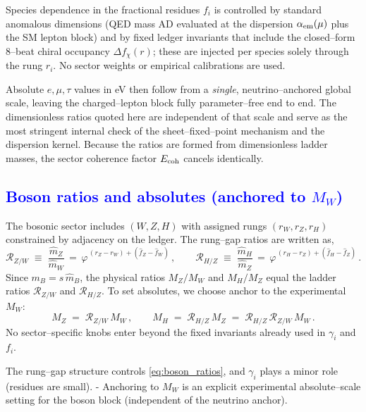 \documentclass[%
 amsmath,amssymb,
 aps,
prb,
floatfix, showkeys
]{revtex4-2}
\newcommand{\modif}[1]{\textcolor{blue}{#1}}
\begin{document}
Species dependence in the fractional residues $f_i$ is controlled by standard anomalous dimensions (QED mass AD evaluated at the dispersion $\alpha_{\rm em}(\mu)$ plus the SM lepton block) and by fixed ledger invariants that include the closed–form 8–beat chiral occupancy $\Delta f_\chi(r)$; these are injected per species solely through the rung $r_i$. No sector weights or empirical calibrations are used.

Absolute $e,\mu,\tau$ values in eV then follow from a \emph{single},
neutrino–anchored global scale, leaving the charged–lepton block fully parameter–free end to end.
The dimensionless ratios quoted here are independent of that scale and serve as the most
stringent internal check of the sheet–fixed–point mechanism and the dispersion kernel.
Because the ratios are formed from dimensionless ladder masses, the sector
coherence factor $E_{\rm coh}$ cancels identically.








{\modif{
\subsection{Boson ratios and absolutes (anchored to $M_W$)}
\label{subsec:bosons}
}}
The bosonic sector includes $(W,Z,H)$ with assigned rungs $(r_W,r_Z,r_H)$ constrained by adjacency on the ledger.
The rung--gap ratios are written as,
\begin{equation}
  \mathcal{R}_{Z/W} \;\equiv\; \frac{\widehat m_Z}{\widehat m_W}
  \,=\, \varphi^{\,(r_Z-r_W) + (\widehat f_Z - \widehat f_W)}\,,\qquad
  \mathcal{R}_{H/Z} \;\equiv\; \frac{\widehat m_H}{\widehat m_Z}
  \,=\, \varphi^{\,(r_H-r_Z) + (\widehat f_H - \widehat f_Z)}\,.
  \label{eq:boson_ratios}
\end{equation}
Since $m_B=s\,\widehat m_B$, the physical ratios $M_Z/M_W$ and $M_H/M_Z$ equal the ladder ratios $\mathcal{R}_{Z/W}$ and $\mathcal{R}_{H/Z}$.
To set absolutes, we choose anchor to the experimental $M_W$:
\begin{equation}
  M_Z \;=\; \mathcal{R}_{Z/W}\,M_W\,,\qquad
  M_H \;=\; \mathcal{R}_{H/Z}\,M_Z \;=\; \mathcal{R}_{H/Z}\,\mathcal{R}_{Z/W}\,M_W\,.
  \label{eq:boson_absolutes}
\end{equation}
No sector--specific knobs enter beyond the fixed invariants already used in $\gamma_i$ and $f_i$.


 The rung--gap structure controls \eqref{eq:boson_ratios}, and  $\gamma_i$ plays a minor role (residues are small).
- Anchoring to $M_W$ is an explicit experimental absolute--scale setting for the boson block (independent of the neutrino anchor).
\end{document}
